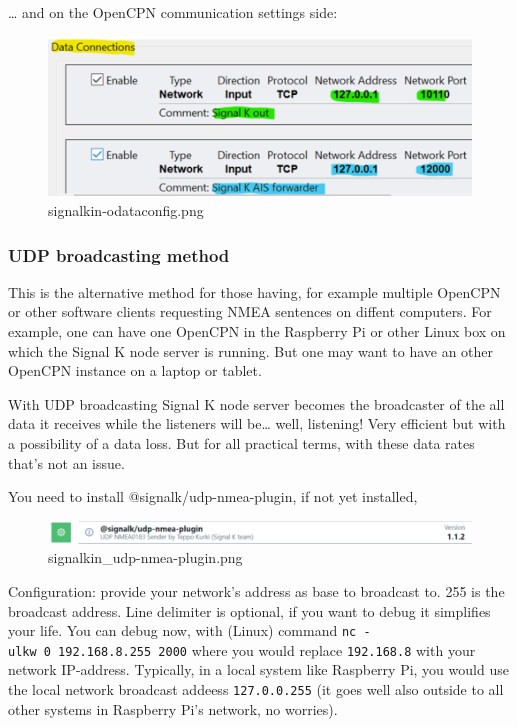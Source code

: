 \documentclass[11pt]{article}
\begin{document}
    \ldots{} and on the OpenCPN communication settings side:

    \begin{figure}
\centering
\includegraphics{signalkin-odataconfig.png}
\caption{signalkin-odataconfig.png}
\end{figure}

    \hypertarget{udp-broadcasting-method}{%
\subsubsection{UDP broadcasting method}\label{udp-broadcasting-method}}

    This is the alternative method for those having, for example multiple
OpenCPN or other software clients requesting NMEA sentences on diffent
computers. For example, one can have one OpenCPN in the Raspberry Pi or
other Linux box on which the Signal K node server is running. But one
may want to have an other OpenCPN instance on a laptop or tablet.

    With UDP broadcasting Signal K node server becomes the broadcaster of
the all data it receives while the listeners will be\ldots{} well,
listening! Very efficient but with a possibility of a data loss. But for
all practical terms, with these data rates that's not an issue.

    You need to install @signalk/udp-nmea-plugin, if not yet installed,

    \begin{figure}
\centering
\includegraphics{signalkin_udp-nmea-plugin.png}
\caption{signalkin\_udp-nmea-plugin.png}
\end{figure}

    Configuration: provide your network's address as base to broadcast to.
255 is the broadcast address. Line delimiter is optional, if you want to
debug it simplifies your life. You can debug now, with (Linux) command
\texttt{nc\ -ulkw\ 0\ 192.168.8.255\ 2000} where you would replace
\texttt{192.168.8} with your network IP-address. Typically, in a local
system like Raspberry Pi, you would use the local network broadcast
addeess \texttt{127.0.0.255} (it goes well also outside to all other
systems in Raspberry Pi's network, no worries).
\end{document}
